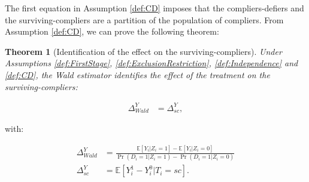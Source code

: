 \documentclass[
]{book}
\newcommand{\esp}[1]{\mathbb{E}[ #1 ]}
\newtheorem{theorem}{Theorem}[chapter]
\theoremstyle{definition}
\theoremstyle{definition}
\theoremstyle{definition}
\theoremstyle{definition}
\theoremstyle{remark}
\begin{document}
The first equation in Assumption \ref{def:CD} imposes that the compliers-defiers and the surviving-compliers are a partition of the population of compliers.
From Assumption \ref{def:CD}, we can prove the following theorem:

\begin{theorem}[Identification of the effect on the surviving-compliers]
\protect\hypertarget{thm:deChaise}{}{\label{thm:deChaise} \iffalse (Identification of the effect on the surviving-compliers) \fi{} }Under Assumptions \ref{def:FirstStage}, \ref{def:ExclusionRestriction}, \ref{def:Independence} and \ref{def:CD}, the Wald estimator identifies the effect of the treatment on the surviving-compliers:

\begin{align*}
  \Delta^Y_{Wald} & = \Delta^Y_{sc},
\end{align*}
\end{theorem}

with:

\begin{align*}
  \Delta^Y_{Wald} & = \frac{\esp{Y_i|Z_i=1} - \esp{Y_i|Z_i=0}}{\Pr(D_i=1|Z_i=1)-\Pr(D_i=1|Z_i=0)}\\
  \Delta^Y_{sc} & = \esp{Y^1_i-Y^0_i|T_i=sc}.
\end{align*}
\end{document}
